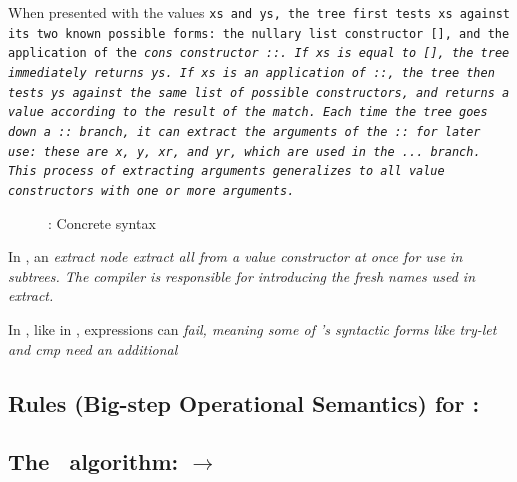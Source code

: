 \documentclass[manuscript,screen,review, 12pt, nonacm]{acmart}
\begin{document}
    When presented with the values \tt{xs} and \tt{ys}, the tree first tests
    \tt{xs} against its two known possible forms: the nullary list constructor
    \tt{[]}, and the application of the \it{cons} constructor \tt{::}. If
    \tt{xs} is equal to \tt{[]}, the tree immediately returns \tt{ys}. If
    \tt{xs} is an application of \tt{::}, the tree then tests \tt{ys} against
    the same list of possible constructors, and returns a value according to the
    result of the match. Each time the tree goes down a \tt{::} branch, it can
    extract the arguments of the \tt{::} for later use: these are \tt{x},
    \tt{y}, \tt{xr}, and \tt{yr}, which are used in the \tt{...} branch. This
    process of extracting arguments generalizes to all value constructors with
    one or more arguments. 

    \begin{figure}
      \begin{center}
      \dcsyntax
      \end{center}
      \caption{\D: Concrete syntax}
      \label{fig:dsyntax}
      \end{figure}



    In \D, an \it{extract} node extract all from a value constructor at once for
    use in subtrees. The compiler is responsible for introducing the fresh names
    used in \it{extract}. 

    In \D, like in \VMinus, expressions can \it{fail}, meaning some of \D's 
    syntactic forms like \it{try-let} and \it{cmp} need an additional 


    \subsection{Rules (Big-step Operational Semantics) for \D:}
    
    \subsection{The \DTran\ algorithm: \VMinus $\rightarrow$ \D}
\end{document}
